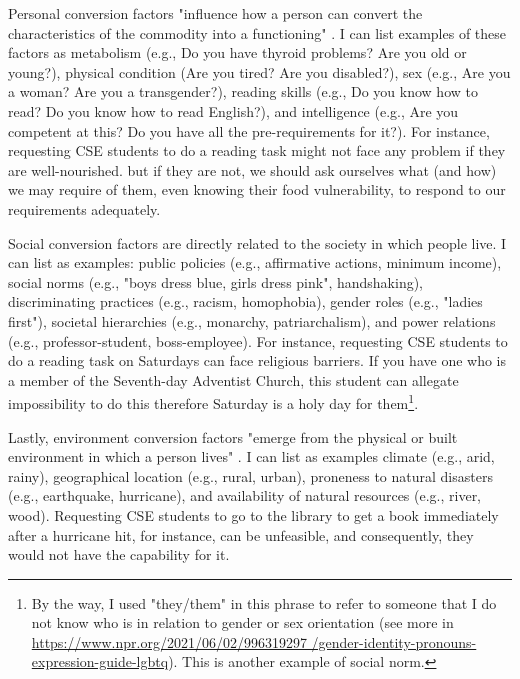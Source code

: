 Personal conversion factors "influence how a person can convert the characteristics of the commodity into a functioning" \cite[p.~99]{robeyns:2005}. I can list examples of these factors as metabolism (e.g., Do you have thyroid problems? Are you old or young?), physical condition (Are you tired? Are you disabled?), sex (e.g., Are you a woman? Are you a transgender?), reading skills (e.g., Do you know how to read? Do you know how to read English?), and intelligence (e.g., Are you competent at this? Do you have all the pre-requirements for it?). For instance, requesting \gls{CSE} students to do a reading task might not face any problem if they are well-nourished. but if they are not, we should ask ourselves what (and how) we may require of them, even knowing their food vulnerability, to respond to our requirements adequately.

Social conversion factors are directly related to the society in which people live. I can list as examples: public policies (e.g., affirmative actions, minimum income), social norms (e.g., "boys dress blue, girls dress pink", handshaking), discriminating practices (e.g., racism, homophobia), gender roles (e.g., "ladies first"), societal hierarchies (e.g., monarchy, patriarchalism), and power relations (e.g., professor-student, boss-employee). For instance, requesting \gls{CSE} students to do a reading task on Saturdays can face religious barriers. If you have one who is a member of the Seventh-day Adventist Church, this student can allegate impossibility to do this therefore Saturday is a holy day for them\footnote{By the way, I used "they/them" in this phrase to refer to someone that I do not know who is in relation to gender or sex orientation (see more in \url{https://www.npr.org/2021/06/02/996319297 /gender-identity-pronouns-expression-guide-lgbtq}). This is another example of social norm.}.

Lastly, environment conversion factors "emerge from the physical or built environment in which a person lives" \cite{robeyns:2023}. I can list as examples climate (e.g., arid, rainy), geographical location (e.g., rural, urban), proneness to natural disasters (e.g., earthquake, hurricane), and availability of natural resources (e.g., river, wood). Requesting \gls{CSE} students to go to the library to get a book immediately after a hurricane hit, for instance, can be unfeasible, and consequently, they would not have the capability for it.

